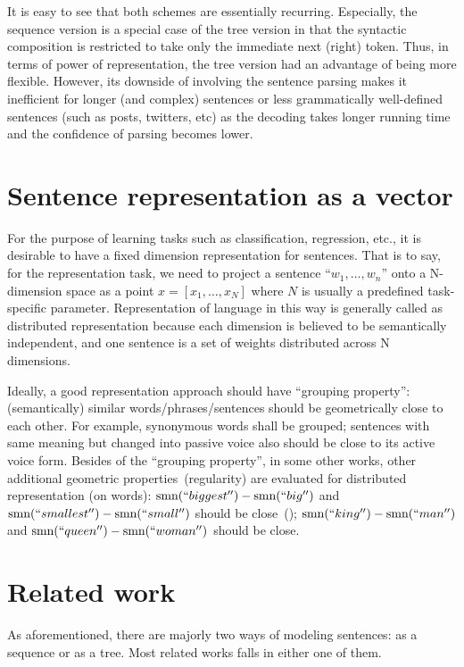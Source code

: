 \documentclass{article} %
\begin{document}
It is easy to see that both schemes are essentially recurring. Especially, the
sequence version is a special case of the tree version in that the syntactic
composition is restricted to take only the immediate next (right) token. Thus,
in terms of power of representation, the tree version had an advantage of being
more flexible. However, its downside of involving the sentence parsing makes it
inefficient for longer (and complex) sentences or less grammatically
well-defined sentences (such as posts, twitters, etc) as the decoding takes
longer running time and the confidence of parsing becomes lower.

\section{Sentence representation as a vector}
For the purpose of learning tasks such as classification, regression, etc., it
is desirable to have a fixed dimension representation for sentences. That is to
say, for the representation task, we need to project a sentence
``$w_1, \dots, w_n$'' onto a N-dimension space as a point $x = [x_1, \dots,
x_N]$ where $N$ is usually a predefined task-specific parameter. Representation
of language in this way is generally called as distributed representation
because each dimension is believed to be semantically independent, and one
sentence is a set of weights distributed across N dimensions.

Ideally, a good representation approach should have ``grouping property'':
(semantically) similar words/phrases/sentences should be geometrically close
to each other. For example, synonymous words shall be grouped; sentences with
same meaning but changed into passive voice also should be close to its active
voice form. Besides of the ``grouping property'', in some other works, other
additional geometric properties~(regularity) are evaluated for distributed
representation (on words):
$\textrm{smn}(``biggest'') - \textrm{smn}(``big'')$ and
$\textrm{smn}(``smallest'') - \textrm{smn}(``small'')$ should be
close~(\cite{mikolov2013efficient,mikolov2013distributed});
$\textrm{smn}(``king'') - \textrm{smn}(``man'')$ and $\textrm{smn}(``queen'') -
\textrm{smn}(``woman'')$ should be close\cite{mikolov2013linguistic}.


\section{Related work}
As aforementioned, there are majorly two ways of modeling sentences:
as a sequence or as a tree. Most related works falls in either one
of them.
\end{document}

